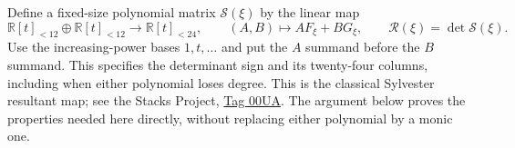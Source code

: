 Define a fixed-size polynomial matrix $\mathscr S(\xi)$ by the
linear map
\begin{equation}
 \mathbb R[t]_{<12}\oplus\mathbb R[t]_{<12}
 \longrightarrow\mathbb R[t]_{<24},\qquad
 (A,B)\longmapsto AF_\xi+BG_\xi,
 \qquad \mathscr R(\xi)=\det\mathscr S(\xi).
 \label{q444:generic-sylvester-map}
\end{equation}
Use the increasing-power bases $1,t,\ldots$ and put the $A$ summand
before the $B$ summand. This specifies the determinant sign and its
twenty-four columns, including when either polynomial loses degree.
This is the classical Sylvester resultant map; see the Stacks Project,
\href{https://stacks.math.columbia.edu/tag/00UA}{Tag 00UA}.
The argument below proves the properties needed here directly, without
replacing either polynomial by a monic one.

